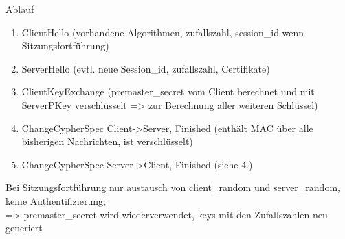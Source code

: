 Ablauf
\begin{enumerate}
\item ClientHello (vorhandene Algorithmen, zufallszahl, session\_id wenn Sitzungsfortführung)
\item ServerHello (evtl. neue Session\_id, zufallszahl, Certifikate)
\item ClientKeyExchange (premaster\_secret vom Client berechnet und mit ServerPKey verschlüsselt => zur Berechnung aller weiteren Schlüssel)
\item ChangeCypherSpec Client->Server, Finished (enthält MAC über alle bisherigen Nachrichten, ist verschlüsselt)
\item ChangeCypherSpec Server->Client, Finished (siehe 4.)
\end{enumerate}
Bei Sitzungsfortführung nur austausch von client\_random und server\_random, keine Authentifizierung;\\
=> premaster\_secret wird wiederverwendet, keys mit den Zufallszahlen neu generiert


